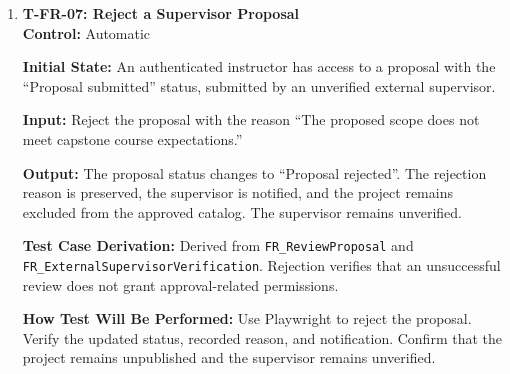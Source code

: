 \documentclass[12pt, titlepage]{article}
\begin{document}
\begin{enumerate}
\textbf{Control:} Automatic

\textbf{Initial State:} An instructor has access to a proposal with the ``Proposal submitted'' status, submitted by an unverified external supervisor.

\textbf{Input:} The instructor requests changes and provides the feedback and comments asking for clarification on the expected project deliverables and scope.

\textbf{Output:} The proposal status becomes ``Proposal changes requested''. The feedback is stored and communicated to the supervisor. The project remains unpublished, and the supervisor remains unverified.

\textbf{Test Case Derivation:} Derived from \texttt{FR\_ReviewProposal} and \texttt{FR\_ExternalSupervisorVerification}. A revision request verifies that feedback does not trigger approval or external supervisor verification.

\textbf{How Test Will Be Performed:} Use Playwright to request changes and submit the predefined feedback. Verify the status, stored feedback, and notification. Confirm that the project is excluded from the approved catalog and that the supervisor remains unverified.

\item \label{T-FR-07}\textbf{T-FR-07: Reject a Supervisor Proposal}\\

\textbf{Control:} Automatic

\textbf{Initial State:} An authenticated instructor has access to a proposal with the ``Proposal submitted'' status, submitted by an unverified external supervisor.

\textbf{Input:} Reject the proposal with the reason ``The proposed scope does not meet capstone course expectations.''

\textbf{Output:} The proposal status changes to ``Proposal rejected''. The rejection reason is preserved, the supervisor is notified, and the project remains excluded from the approved catalog. The supervisor remains unverified.

\textbf{Test Case Derivation:} Derived from \texttt{FR\_ReviewProposal} and \texttt{FR\_ExternalSupervisorVerification}. Rejection verifies that an unsuccessful review does not grant approval-related permissions.

\textbf{How Test Will Be Performed:} Use Playwright to reject the proposal. Verify the updated status, recorded reason, and notification. Confirm that the project remains unpublished and the supervisor remains unverified.


\end{enumerate}
\end{document}
